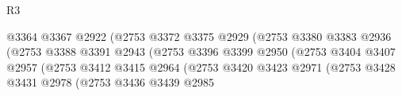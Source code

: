 \begin{lexlean}{R3}
\begin{coremodule}
                                                    @3364
                                                    @3367
                                                    @2922
                                                    (@2753
                                                      @3372
                                                      @3375
                                                      @2929
                                                      (@2753
                                                        @3380
                                                        @3383
                                                        @2936
                                                        (@2753
                                                          @3388
                                                          @3391
                                                          @2943
                                                          (@2753
                                                            @3396
                                                            @3399
                                                            @2950
                                                            (@2753
                                                              @3404
                                                              @3407
                                                              @2957
                                                              (@2753
                                                                @3412
                                                                @3415
                                                                @2964
                                                                (@2753
                                                                  @3420
                                                                  @3423
                                                                  @2971
                                                                  (@2753
                                                                    @3428
                                                                    @3431
                                                                    @2978
                                                                    (@2753
                                                                      @3436
                                                                      @3439
                                                                      @2985

\end{coremodule}
\end{lexlean}
